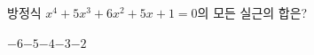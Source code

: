 방정식 $x^4+5x^3+6x^2+5x+1=0$의 모든 실근의 합은?
\begin{choices32}{$-6$}{$-5$}{$-4$}{$-3$}{$-2$}\end{choices32}
